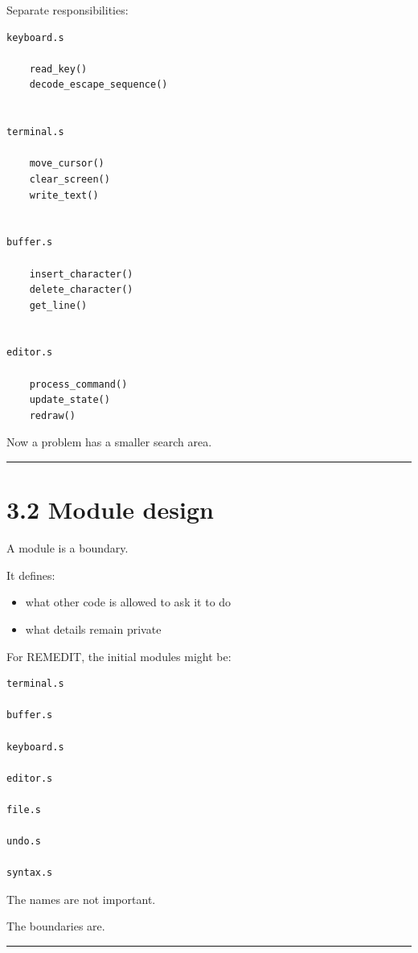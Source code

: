 \documentclass[
  oneside,
  openany]{book}
\providecommand{\tightlist}{%
  \setlength{\itemsep}{0pt}\setlength{\parskip}{0pt}}
\begin{document}
Separate responsibilities:

\begin{verbatim}
keyboard.s

    read_key()
    decode_escape_sequence()


terminal.s

    move_cursor()
    clear_screen()
    write_text()


buffer.s

    insert_character()
    delete_character()
    get_line()


editor.s

    process_command()
    update_state()
    redraw()
\end{verbatim}

Now a problem has a smaller search area.

\begin{center}\rule{0.5\linewidth}{0.5pt}\end{center}

\hypertarget{module-design}{%
\section{3.2 Module design}\label{module-design}}

A module is a boundary.

It defines:

\begin{itemize}
\tightlist
\item
  what other code is allowed to ask it to do
\item
  what details remain private
\end{itemize}

For REMEDIT, the initial modules might be:

\begin{verbatim}
terminal.s

buffer.s

keyboard.s

editor.s

file.s

undo.s

syntax.s
\end{verbatim}

The names are not important.

The boundaries are.

\begin{center}\rule{0.5\linewidth}{0.5pt}\end{center}
\end{document}
